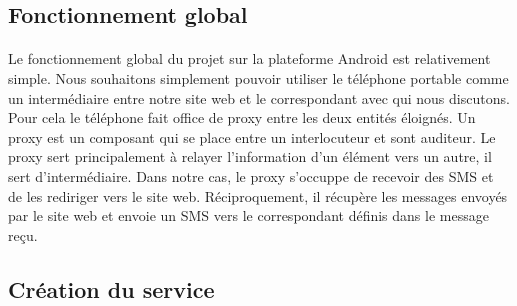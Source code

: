 \subsection{Fonctionnement global}


\paragraph{}
Le fonctionnement global du projet sur la plateforme Android est relativement simple. Nous souhaitons
simplement pouvoir utiliser le téléphone portable comme un intermédiaire entre notre site web et le 
correspondant avec qui nous discutons. Pour cela le téléphone fait office de proxy entre les deux 
entités éloignés. Un proxy est un composant qui se place entre un interlocuteur et sont auditeur. Le 
proxy sert principalement à relayer l'information d'un élément vers un autre, il sert d'intermédiaire.
Dans notre cas, le proxy s'occuppe de recevoir des SMS et de les rediriger vers le site web. 
Réciproquement, il récupère les messages envoyés par le site web et envoie un SMS vers le correspondant
définis dans le message reçu.




\subsection{Création du service}



